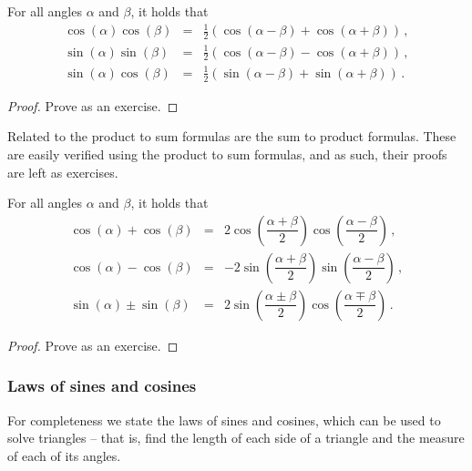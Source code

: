 \begin{theorem} \label{producttosum}  
For all angles $\alpha$ and $\beta$, it holds that  
\begin{eqnarray}
\cos(\alpha)\cos(\beta) &=& \frac{1}{2} \left( \cos(\alpha - \beta) + \cos(\alpha + \beta)\right)\,,\\[0.2cm]
\sin(\alpha)\sin(\beta) &=& \frac{1}{2} \left( \cos(\alpha - \beta) - \cos(\alpha + \beta)\right)\,,\\[0.2cm]
\sin(\alpha)\cos(\beta) &=& \frac{1}{2} \left( \sin(\alpha - \beta) + \sin(\alpha + \beta)\right)\,.
\end{eqnarray}

\end{theorem}
\ifanalysis
\begin{proof}
Prove as an exercise.
\end{proof}
\fi

Related to the product to sum formulas are the sum to product formulas.  These are easily verified using the product to sum formulas, and as such, their proofs are left as exercises.

\begin{theorem} \label{sumtoproduct}  For all angles $\alpha$ and $\beta$, it holds that 
\begin{eqnarray}
\cos(\alpha) + \cos(\beta) &=& 2 \cos\left( \dfrac{\alpha + \beta}{2}\right)\cos\left( \dfrac{\alpha - \beta}{2}\right)\,,\\[0.2cm]
\cos(\alpha) -  \cos(\beta) &=& - 2 \sin\left( \dfrac{\alpha + \beta}{2}\right)\sin\left( \dfrac{\alpha - \beta}{2}\right)\,,\\[0.2cm]
\sin(\alpha) \pm \sin(\beta) &=& 2 \sin\left( \dfrac{\alpha \pm \beta}{2}\right)\cos\left( \dfrac{\alpha \mp \beta}{2}\right)\,.
\end{eqnarray}
 
\end{theorem}
\ifanalysis
\begin{proof}
Prove as an exercise.
\end{proof}
\fi


\ifvc
\subsubsection{Laws of sines and cosines}
For completeness we state the laws of sines and cosines, which can be used to solve triangles -- that is, find the length of each side of a triangle and the measure of each of its angles.

